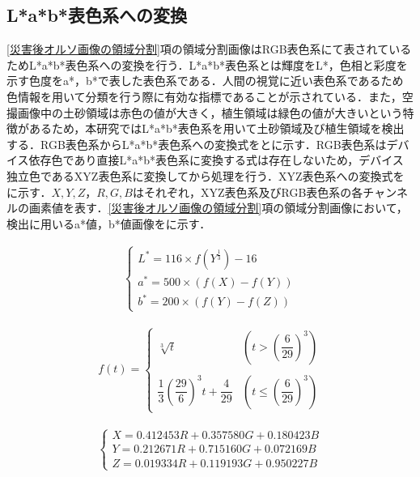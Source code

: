     \subsection{L*a*b*表色系への変換}
      \label{L*a*b*表色系への変換}
      \ref{災害後オルソ画像の領域分割}項の領域分割画像はRGB表色系にて表されているためL*a*b*表色系への変換\cite{Lab表色系1}を行う．L*a*b*表色系とは輝度をL*，色相と彩度を示す色度をa*，b*で表した表色系である．人間の視覚に近い表色系であるため色情報を用いて分類を行う際に有効な指標であることが示されている．また，空撮画像中の土砂領域は赤色の値が大きく，植生領域は緑色の値が大きいという特徴があるため，本研究ではL*a*b*表色系を用いて土砂領域及び植生領域を検出する\cite{Lab表色系2, Lab表色系3, Lab表色系4}．RGB表色系からL*a*b*表色系への変換式をとに示す．RGB表色系はデバイス依存色であり直接L*a*b*表色系に変換する式は存在しないため，デバイス独立色であるXYZ表色系\cite{XYZ表色系}に変換してから処理を行う．XYZ表色系への変換式をに示す．$X,Y,Z$，$R,G,B$はそれぞれ，XYZ表色系及びRGB表色系の各チャンネルの画素値を表す．\ref{災害後オルソ画像の領域分割}項の領域分割画像において，検出に用いるa*値，b*値画像をに示す．
      
      \begin{eqnarray}
      \label{Lab表色系1}
        \left\{
          \begin{array}{l}
            L^* = 116 \times f(Y^{\frac{1}{3}}) - 16 \\
            a^* = 500 \times (f(X) - f(Y)) \\
            b^* = 200 \times (f(Y) - f(Z))
          \end{array}
        \right.
      \end{eqnarray}

      \begin{eqnarray}
        \label{Lab表色系2}
          f(t) = 
          \left\{
            \begin{array}{lll}
              \sqrt[3]{t} 
                &(t >    (\dfrac{6} {29})^3) \\ \\
              \dfrac{1} {3} (\dfrac{29} {6})^3 t + \dfrac{4} {29}
                &(t \leq (\dfrac{6} {29})^3)
            \end{array}
          \right.
      \end{eqnarray}

      \begin{eqnarray}
        \label{XYZ表色系}
        \left\{
          \begin{array}{l}
            X = 0.412453R + 0.357580G + 0.180423B \\
            Y = 0.212671R + 0.715160G + 0.072169B \\
            Z = 0.019334R + 0.119193G + 0.950227B
          \end{array}
        \right.
      \end{eqnarray}

